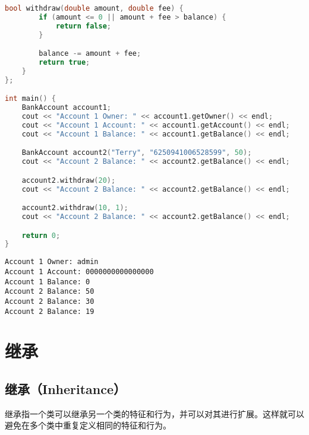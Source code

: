 \begin{lstlisting}[language=C++]
    bool withdraw(double amount, double fee) {
        if (amount <= 0 || amount + fee > balance) {
            return false;
        }

        balance -= amount + fee;
        return true;
    }
};

int main() {
    BankAccount account1;
    cout << "Account 1 Owner: " << account1.getOwner() << endl;
    cout << "Account 1 Account: " << account1.getAccount() << endl;
    cout << "Account 1 Balance: " << account1.getBalance() << endl;

    BankAccount account2("Terry", "6250941006528599", 50);
    cout << "Account 2 Balance: " << account2.getBalance() << endl;

    account2.withdraw(20);
    cout << "Account 2 Balance: " << account2.getBalance() << endl;

    account2.withdraw(10, 1);
    cout << "Account 2 Balance: " << account2.getBalance() << endl;

    return 0;
}
\end{lstlisting}

\begin{tcolorbox}
    \begin{verbatim}
Account 1 Owner: admin
Account 1 Account: 0000000000000000
Account 1 Balance: 0
Account 2 Balance: 50
Account 2 Balance: 30
Account 2 Balance: 19
	\end{verbatim}
\end{tcolorbox}

\newpage

\section{继承}

\subsection{继承（Inheritance）}

继承指一个类可以继承另一个类的特征和行为，并可以对其进行扩展。这样就可以避免在多个类中重复定义相同的特征和行为。\\

